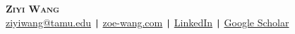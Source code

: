 \begin{center}
    \textbf{\Huge \scshape Ziyi Wang } \\ \vspace{10pt}
    \small 
    \href{mailto:ziyiwang@tamu.edu}{ziyiwang@tamu.edu} \quad
    \texttt{|} \quad \href{https://www.zoe-wang.com/}{zoe-wang.com} \quad
    \texttt{|} \quad \href{https://www.linkedin.com/in/ziyi-wang-488122292/}{LinkedIn} \quad
    \texttt{|} \quad \href{https://scholar.google.com/citations?user=dYNpjEUAAAAJ&hl=en}{Google Scholar} 
\end{center}
